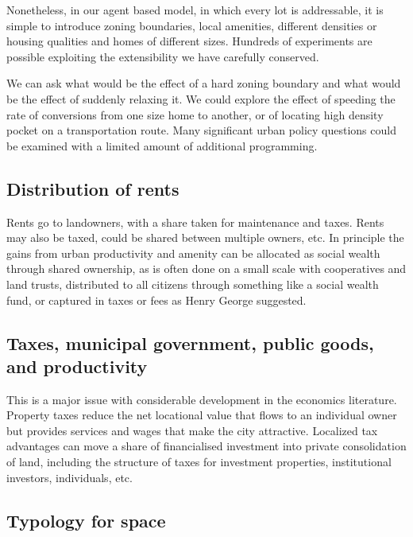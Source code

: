 Nonetheless, in our agent based model, in which every lot is  addressable, it is simple to introduce zoning boundaries, local amenities, different densities or housing qualities and homes of different sizes. Hundreds of experiments are possible exploiting  the extensibility we have carefully conserved.  

We can ask what would be the effect of a hard zoning boundary and what would be the effect of suddenly relaxing it. We could explore the effect of speeding the rate of conversions from one size  home to another, or of locating high density pocket on a transportation route. Many significant urban policy questions could be examined with a limited amount of additional programming. 

\subsection{Distribution of rents}
Rents go to landowners, with a share taken for maintenance and taxes.
Rents may also be taxed, could be shared between multiple owners, etc.
In principle the gains from urban productivity and amenity can be allocated as social wealth through shared ownership, as is often done on a small scale with cooperatives and land trusts, distributed to all citizens through something like a social wealth fund, or captured in taxes or fees as Henry George suggested. 

\subsection{Taxes, municipal government, public goods, and productivity}
This is a major issue with considerable development in the economics literature. Property taxes reduce the net locational value that flows to an individual owner but provides services and wages that make the city attractive. 
Localized tax advantages can move a share of financialised investment into private consolidation of land, 
including the structure of taxes for investment properties, institutional investors, individuals, etc.


\subsection{Typology for space}

